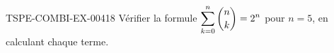\begin{exercice}{TSPE-COMBI-EX-004}{1}{8}
Vérifier la formule $\displaystyle\sum_{k=0}^{n}\dbinom{n}{k} = 2^n$ pour $n=5$, en calculant chaque terme.
\end{exercice}
